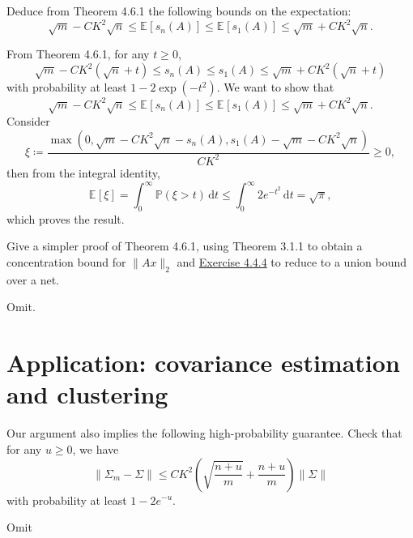 \begin{problem*}[Exercise 4.6.3]\label{ex4.6.3}
	Deduce from Theorem 4.6.1 the following bounds on the expectation:
	\[
		\sqrt{m} - CK^2 \sqrt{n}
		\leq \mathbb{E}_{}[s_n(A)]
		\leq \mathbb{E}_{}[s_1(A)]
		\leq \sqrt{m} + CK^2 \sqrt{n} .
	\]
\end{problem*}
\begin{answer}
	From Theorem 4.6.1, for any \(t \geq 0\),
	\[
		\sqrt{m} - CK^2 (\sqrt{n} + t)
		\leq s_n(A)
		\leq s_1(A)
		\leq \sqrt{m} + CK^2 (\sqrt{n} + t)
	\]
	with probability at least \(1 - 2 \exp (-t^2)\). We want to show that
	\[
		\sqrt{m} - CK^2 \sqrt{n}
		\leq \mathbb{E}_{}[s_n(A)]
		\leq \mathbb{E}_{}[s_1(A)]
		\leq \sqrt{m} + CK^2 \sqrt{n}.
	\]
	Consider
	\[
		\xi
		\coloneqq \frac{\max \left( 0, \sqrt{m} - CK^2 \sqrt{n} - s_n (A) , s_1(A) - \sqrt{m} - CK^2 \sqrt{n}  \right) }{CK^2}
		\geq 0,
	\]
	then from the integral identity,
	\[
		\mathbb{E}_{}[\xi ]
		= \int_{0}^{\infty} \mathbb{P} (\xi > t) \,\mathrm{d}t
		\leq \int_{0}^{\infty} 2 e^{-t^2} \,\mathrm{d}t
		= \sqrt{\pi },
	\]
	which proves the result.
\end{answer}

\begin{problem*}[Exercise 4.6.4]\label{ex4.6.4}
	Give a simpler proof of Theorem 4.6.1, using Theorem 3.1.1 to obtain a concentration bound for \(\lVert Ax \rVert _2\) and \hyperref[ex4.4.4]{Exercise 4.4.4} to reduce to a union bound over a net.
\end{problem*}
\begin{answer}
	Omit.
\end{answer}

\section{Application: covariance estimation and clustering}
\begin{problem*}[Exercise 4.7.3]\label{ex4.7.3}
	Our argument also implies the following high-probability guarantee. Check that for any \(u \geq 0\), we have
	\[
		\lVert \Sigma _m - \Sigma  \rVert
		\leq CK^2 \left( \sqrt{\frac{n + u}{m}} + \frac{n+u}{m} \right) \lVert \Sigma \rVert
	\]
	with probability at least \(1 - 2 e^{-u}\).
\end{problem*}
\begin{answer}
	Omit
\end{answer}

